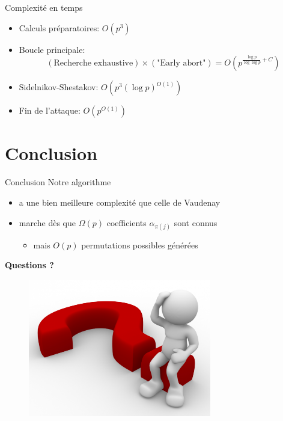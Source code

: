 \documentclass[]{beamer}
\begin{document}
\begin{frame}{Complexité en temps}
\begin{itemize}
\item Calculs préparatoires: $O\left(p^3\right)$
\item Boucle principale:
$$ (\text{Recherche exhaustive}) \times (\text{"Early abort"}) = O\left( p^{\frac{\log p}{\log \log p} + C} \right) $$
\item Sidelnikov-Shestakov: $O\left(p^3 (\log p)^{O(1)} \right)$
\item Fin de l'attaque: $O\left(p^{O(1)}\right)$
\end{itemize}

\end{frame}


\section{Conclusion}

\begin{frame}{Conclusion}
Notre algorithme
\begin{itemize}
\item a une bien meilleure complexité que celle de Vaudenay
\item marche dès que $\Omega(p)$ coefficients $\alpha_{\pi(j)}$ sont connus
\begin{itemize}
\item mais $O(p)$ permutations possibles générées
\end{itemize}
\end{itemize}
\end{frame}


\begin{frame}
\begin{center}
\huge{\textbf{Questions ?}}
\end{center}
\begin{figure}
   \centering
   \includegraphics[width=8cm]{pictures/questions.png}
\end{figure}
\end{frame}
\end{document}
